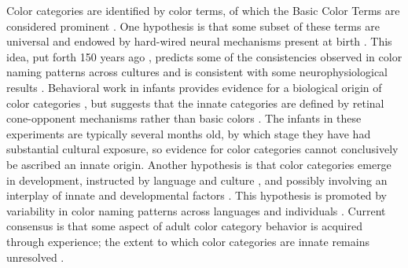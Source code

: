 Color categories are identified by color terms, of which the Basic Color Terms are considered prominent \citep{berlin_basic_1969}.
One hypothesis is that some subset of these terms are universal \citep{heider_universals_1972,regier_focal_2005}
and endowed by hard-wired neural mechanisms present at birth \citep{bornstein_categories_1976,lindsey_universality_2006}. 
This idea, put forth 150 years ago \citep{hering_zur_1875}, predicts some of the consistencies observed in color naming patterns across cultures \citep{jameson_evolutionary_2009,baronchelli_modeling_2010,lindsey_hunter-gatherer_2015,abbott_focal_2016}
and is consistent with some neurophysiological results \citep{clifford_electrophysiological_2009,holmes_neurophysiological_2009,brouwer_categorical_2013,bird_categorical_2014,yang_cortical_2016,forder_colour_2017}. 
Behavioral work in infants provides evidence for a biological origin of color categories \citep{franklin_new_2004,ozturk_language_2013}, but suggests that the innate categories are defined by retinal cone-opponent mechanisms rather than basic colors \citep{skelton_biological_2017,maule_color_2019}.
The infants in these experiments are typically several months old, by which stage they have had substantial cultural exposure, so evidence for color categories cannot conclusively be ascribed an innate origin.
Another hypothesis is that color categories emerge in development, instructed by language and culture \citep{roberson_color_2005, regier_language_2009, cibelli_sapir-whorf_2016}, and possibly involving an interplay of innate and developmental factors \citep{kay_language_2006,franklin_lateralization_2008,regier_language_2009}. 
This hypothesis is promoted by variability in color naming patterns across languages and individuals \citep{davidoff_colour_1999,roberson_color_2000,paramei_online_2018,webster_variations_2002}.
Current consensus is that some aspect of adult color category behavior is acquired through experience; the extent to which color categories are innate remains unresolved \citep{davidoff_nature_2009,skelton_colour_2023}.


